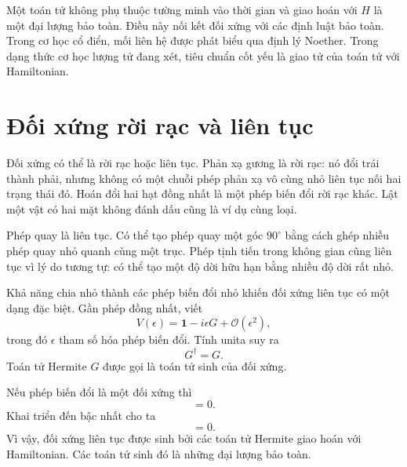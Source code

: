 \begin{classroomqa}
\end{classroomqa}

Một toán tử không phụ thuộc tường minh vào thời gian và giao hoán với \(H\) là một đại lượng bảo toàn. Điều này nối kết đối xứng với các định luật bảo toàn. Trong cơ học cổ điển, mối liên hệ được phát biểu qua định lý Noether. Trong dạng thức cơ học lượng tử đang xét, tiêu chuẩn cốt yếu là giao tử của toán tử với Hamiltonian.

\section{Đối xứng rời rạc và liên tục}

Đối xứng có thể là rời rạc hoặc liên tục. Phản xạ gương là rời rạc: nó đổi trái thành phải, nhưng không có một chuỗi phép phản xạ vô cùng nhỏ liên tục nối hai trạng thái đó. Hoán đổi hai hạt đồng nhất là một phép biến đổi rời rạc khác. Lật một vật có hai mặt không đánh dấu cũng là ví dụ cùng loại.

Phép quay là liên tục. Có thể tạo phép quay một góc \(90^\circ\) bằng cách ghép nhiều phép quay nhỏ quanh cùng một trục. Phép tịnh tiến trong không gian cũng liên tục vì lý do tương tự: có thể tạo một độ dời hữu hạn bằng nhiều độ dời rất nhỏ.

Khả năng chia nhỏ thành các phép biến đổi nhỏ khiến đối xứng liên tục có một dạng đặc biệt. Gần phép đồng nhất, viết
\begin{equation}
V(\epsilon)
=
\mathbf 1-i\epsilon G+\mathcal O(\epsilon^2),
\end{equation}
trong đó \(\epsilon\) tham số hóa phép biến đổi. Tính unita suy ra
\begin{equation}
G^\dagger=G.
\end{equation}
Toán tử Hermite \(G\) được gọi là toán tử sinh của đối xứng.

Nếu phép biến đổi là một đối xứng thì
\begin{equation}
[H,V(\epsilon)]=0.
\end{equation}
Khai triển đến bậc nhất cho ta
\begin{equation}
[H,G]=0.
\end{equation}
Vì vậy, đối xứng liên tục được sinh bởi các toán tử Hermite giao hoán với Hamiltonian. Các toán tử sinh đó là những đại lượng bảo toàn.

